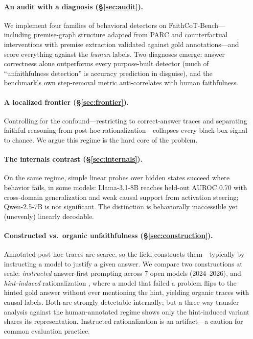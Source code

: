 \documentclass[11pt]{article}
\begin{document}
\paragraph{An audit with a diagnosis (\S\ref{sec:audit}).} We implement four families of behavioral detectors on FaithCoT-Bench---including premise-graph structure adapted from PARC \citep{mukherjee2025parc} and counterfactual interventions with premise extraction validated against gold annotations---and score everything against the \emph{human} labels. Two diagnoses emerge: answer correctness alone outperforms every purpose-built detector (much of ``unfaithfulness detection'' is accuracy prediction in disguise), and the benchmark's own step-removal metric anti-correlates with human faithfulness.

\paragraph{A localized frontier (\S\ref{sec:frontier}).} Controlling for the confound---restricting to correct-answer traces and separating faithful reasoning from post-hoc rationalization---collapses every black-box signal to chance. We argue this regime is the hard core of the problem.

\paragraph{The internals contrast (\S\ref{sec:internals}).} On the same regime, simple linear probes over hidden states succeed where behavior fails, in some models: Llama-3.1-8B reaches held-out AUROC 0.70 with cross-domain generalization and weak causal support from activation steering; Qwen-2.5-7B is not significant. The distinction is behaviorally inaccessible yet (unevenly) linearly decodable.

\paragraph{Constructed vs.\ organic unfaithfulness (\S\ref{sec:construction}).} Annotated post-hoc traces are scarce, so the field constructs them---typically by instructing a model to justify a given answer. We compare two constructions at scale: \emph{instructed} answer-first prompting across 7 open models (2024--2026), and \emph{hint-induced} rationalization \citep{turpin2023language}, where a model that failed a problem flips to the hinted gold answer without ever mentioning the hint, yielding organic traces with causal labels. Both are strongly detectable internally; but a three-way transfer analysis against the human-annotated regime shows only the hint-induced variant shares its representation. Instructed rationalization is an artifact---a caution for common evaluation practice.
\end{document}
